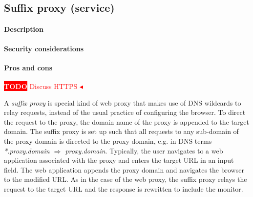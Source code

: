\documentclass{llncs}
\newcommand{\todo}[1]{\colorbox{red}{\textcolor{white}{\sffamily\bfseries\scriptsize TODO}} \textcolor{red}{#1} \textcolor{red}{$\blacktriangleleft$}}
\begin{document}
\subsection{Suffix proxy (service)}

\paragraph{Description}

\paragraph{Security considerations}

\paragraph{Pros and cons}

\todo{Discuss HTTPS}



A \emph{suffix proxy} is special kind of web proxy that makes use of DNS wildcards to 
relay requests, instead of the usual practice of configuring the browser.
To direct the request to the proxy, the domain name of the 
proxy is appended to the target domain. The suffix proxy is set up such
that all requests to any sub-domain of the proxy domain is directed to the proxy domain, 
e.g. in DNS terms \emph{*.proxy.domain $\Rightarrow$ proxy.domain}. Typically, the user navigates to a 
web application associated with the proxy and enters the target URL in 
an input field. The web application appends the proxy domain and navigates the 
browser to the modified URL. As in the case of the web proxy, the suffix proxy 
relays the request to the target URL and the response is rewritten to include 
the monitor.
\end{document}
